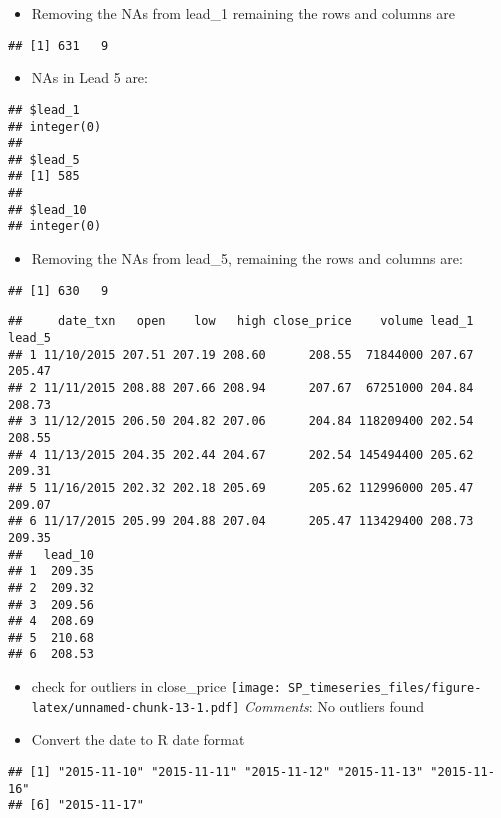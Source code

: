 \documentclass[]{article}
\providecommand{\tightlist}{%
  \setlength{\itemsep}{0pt}\setlength{\parskip}{0pt}}
\begin{document}
\begin{itemize}
\tightlist
\item
  Removing the NAs from lead\_1 remaining the rows and columns are
\end{itemize}

\begin{verbatim}
## [1] 631   9
\end{verbatim}

\begin{itemize}
\tightlist
\item
  NAs in Lead 5 are:
\end{itemize}

\begin{verbatim}
## $lead_1
## integer(0)
## 
## $lead_5
## [1] 585
## 
## $lead_10
## integer(0)
\end{verbatim}

\begin{itemize}
\tightlist
\item
  Removing the NAs from lead\_5, remaining the rows and columns are:
\end{itemize}

\begin{verbatim}
## [1] 630   9
\end{verbatim}

\begin{verbatim}
##     date_txn   open    low   high close_price    volume lead_1 lead_5
## 1 11/10/2015 207.51 207.19 208.60      208.55  71844000 207.67 205.47
## 2 11/11/2015 208.88 207.66 208.94      207.67  67251000 204.84 208.73
## 3 11/12/2015 206.50 204.82 207.06      204.84 118209400 202.54 208.55
## 4 11/13/2015 204.35 202.44 204.67      202.54 145494400 205.62 209.31
## 5 11/16/2015 202.32 202.18 205.69      205.62 112996000 205.47 209.07
## 6 11/17/2015 205.99 204.88 207.04      205.47 113429400 208.73 209.35
##   lead_10
## 1  209.35
## 2  209.32
## 3  209.56
## 4  208.69
## 5  210.68
## 6  208.53
\end{verbatim}

\begin{itemize}
\item
  check for outliers in close\_price
  \texttt{[image: SP\_timeseries\_files/figure-latex/unnamed-chunk-13-1.pdf]}
  \emph{Comments}: No outliers found
\item
  Convert the date to R date format
\end{itemize}

\begin{verbatim}
## [1] "2015-11-10" "2015-11-11" "2015-11-12" "2015-11-13" "2015-11-16"
## [6] "2015-11-17"
\end{verbatim}
\end{document}
